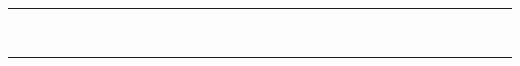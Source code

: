 %
%
% 
%




\thispagestyle{empty}
\vspace*{9mm}
\begin{center}
    \rule[0.5ex]{\linewidth}{2pt}\vspace*{-\baselineskip}\vspace*{3.2pt}\\
    \rule[0.5ex]{\linewidth}{2pt}\\
    

\end{center}
